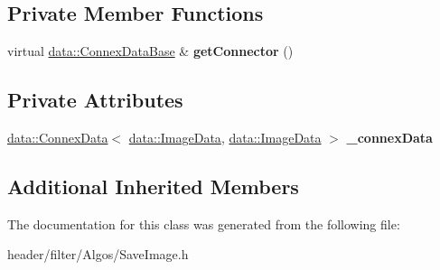 \subsection*{Private Member Functions}
\begin{DoxyCompactItemize}
\item 
\mbox{\label{classfilter_1_1algos_1_1_save_image_a20a933db8ed9acfd01c3ee40c58b8bac}} 
virtual \hyperlink{classfilter_1_1data_1_1_connex_data_base}{data\+::\+Connex\+Data\+Base} \& {\bfseries get\+Connector} ()
\end{DoxyCompactItemize}
\subsection*{Private Attributes}
\begin{DoxyCompactItemize}
\item 
\mbox{\label{classfilter_1_1algos_1_1_save_image_a6d20fec8f50fc8fe30825ead0f0e85e7}} 
\hyperlink{classfilter_1_1data_1_1_connex_data}{data\+::\+Connex\+Data}$<$ \hyperlink{classfilter_1_1data_1_1_image_data}{data\+::\+Image\+Data}, \hyperlink{classfilter_1_1data_1_1_image_data}{data\+::\+Image\+Data} $>$ {\bfseries \+\_\+connex\+Data}
\end{DoxyCompactItemize}
\subsection*{Additional Inherited Members}


The documentation for this class was generated from the following file\+:\begin{DoxyCompactItemize}
\item 
header/filter/\+Algos/Save\+Image.\+h\end{DoxyCompactItemize}
